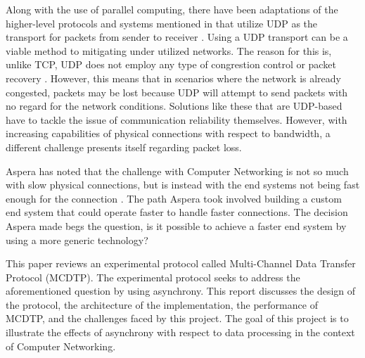 Along with the use of parallel computing, there have been adaptations of the higher-level protocols and systems mentioned in \cite{Fan2010} that utilize UDP as the transport for packets from sender to receiver \cite{He2002}\cite{Fan2010}\cite{Aspera2016}\cite{Meiss2007}\cite{gu2007udt}. Using a UDP transport can be a viable method to mitigating under utilized networks. The reason for this is, unlike TCP, UDP does not employ any type of congrestion control or packet recovery \cite{postel1980user}. However, this means that in scenarios where the network is already congested, packets may be lost because UDP will attempt to send packets with no regard for the network conditions. Solutions like these that are UDP-based have to tackle the issue of communication reliability themselves. However, with increasing capabilities of physical connections with respect to bandwidth, a different challenge presents itself regarding packet loss.

Aspera has noted that the challenge with Computer Networking is not so much with slow physical connections, but is instead with the end systems not being fast enough for the connection \cite{Fan2010}\cite{Aspera2016}. The path Aspera took involved building a custom end system that could operate faster to handle faster connections. The decision Aspera made begs the question, is it possible to achieve a faster end system by using a more generic technology?

This paper reviews an experimental protocol called Multi-Channel Data Transfer Protocol (MCDTP). The experimental protocol seeks to address the aforementioned question by using asynchrony. This report discusses the design of the protocol, the architecture of the implementation, the performance of MCDTP, and the challenges faced by this project. The goal of this project is to illustrate the effects of asynchrony with respect to data processing in the context of Computer Networking.

